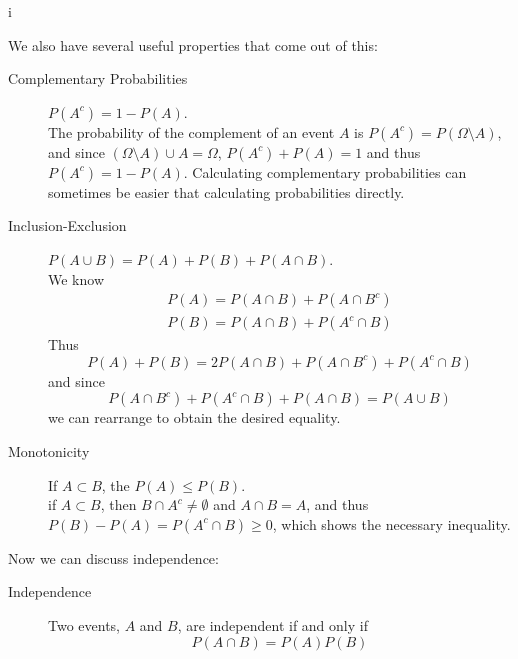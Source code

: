 i\documentclass[10pt]{article}
\begin{document}
We also have several useful properties that come out of this:
\begin{description}
    \item[Complementary Probabilities] $P(A^c) = 1 -P(A)$. \\
        The probability of the complement of
        an event $A$ is $P(A^c) = P(\Omega \setminus A)$, and since 
        $(\Omega \setminus A) \cup A = \Omega$, $P(A^c) + P(A) = 1$ and thus 
        $P(A^c) = 1 -P(A)$. 
        Calculating complementary probabilities can sometimes be easier that
        calculating probabilities directly.
    \item[Inclusion-Exclusion] $P(A \cup B) = P(A) + P(B) + P(A \cap B)$.\\
        We know
        \begin{align*}
            P(A) = P(A \cap B) + P(A \cap B^c) \\ 
            P(B) = P(A \cap B) + P(A^c \cap B) 
        \end{align*}
        Thus 
        \[P(A) + P(B) = 2P(A \cap B) + P(A \cap B^c) + P(A^c \cap B)\] 
        and since 
        \[P(A \cap B^c) + P(A^c \cap B) + P(A \cap B) = P(A \cup B)\] 
        we can rearrange to obtain the desired equality. 
    \item[Monotonicity] If $A \subset B$, the $P(A) \leq P(B)$. \\
        if $A \subset B$, then $B \cap A^c \neq \emptyset$ and $A \cap B = A$, and thus
        $P(B) - P(A) = P(A^c \cap B) \geq 0$, which shows the necessary inequality.
\end{description}

Now we can discuss independence:
\begin{description}
    \item[Independence] Two events, $A$ and $B$, are independent if and only if 
        \[ P(A \cap B) = P(A)P(B) \]
\end{description}
\end{document}
